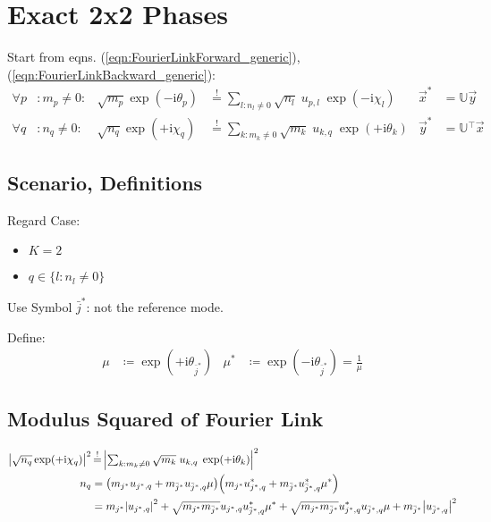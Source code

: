 \documentclass[
	english,
	a4paper,
	fontsize=10pt,
	parskip=half,
	titlepage=true,
	DIV=12,
	final
]{scrreprt}
\newcommand*{\transp}{\ensuremath{^\intercal}}
\newcommand*{\iunit}{\ensuremath{\mathrm{i}}}
\newcommand*{\equalCond}{  \mathop{=}\limits^!  }
\begin{document}
\chapter{Exact 2x2 Phases}
Start from eqns. (\ref{eqn:FourierLinkForward_generic}), (\ref{eqn:FourierLinkBackward_generic}):
\begin{align*}
	\forall p &: m_p \neq 0 :
&
	\sqrt{m_p} \exp(-\iunit \theta_p)
&\equalCond
	\sum_{l : n_l \neq 0} \sqrt{n_l} \; u_{p,l} \; \exp(-\iunit\chi_l)
&
	\vec{x}^{*} &= \mathbb{U} \vec{y}
\\
	\forall q &: n_q \neq 0 :
&
	\sqrt{n_q} \exp(+\iunit \chi_q)
&\equalCond
	\sum_{k : m_k \neq 0}
	\sqrt{m_k} \; u_{k,q} \; \exp(+\iunit\theta_k)
&
	\vec{y}^{*} &= \mathbb{U}\transp \vec{x}
\end{align*}

\section{Scenario, Definitions}
Regard Case:
\begin{itemize}
\item $K = 2$
\item $q \in \{l : n_l \neq 0\}$
\end{itemize}

Use Symbol $\bar{j}^*$: not the reference mode.

Define:
\begin{align}
	\mu
&\coloneqq
	\exp(+\iunit \theta_{\bar{j}^*})
&
	\mu^*
&\coloneqq
	\exp(-\iunit \theta_{\bar{j}^*})
=
	\frac{1}{\mu}
\end{align}

\section{Modulus Squared of Fourier Link}
\begin{align}
	\abs{
		\sqrt{n_q} \exp(+\iunit \chi_q)
	}^2
&\equalCond
	\abs{
		\textstyle \sum_{k : m_k \neq 0}
			\sqrt{m_k} \; u_{k,q} \; \exp(+\iunit\theta_k)
	}^2
\\
	n_q
&=
	\qty(
		m_{     j ^*} u_{     j ^*, q} +
		m_{\bar{j}^*} u_{\bar{j}^*, q} \mu
	)	
	\qty(
		m_{     j ^*} u_{     j ^*, q}^* +
		m_{\bar{j}^*} u_{\bar{j}^*, q}^* \mu^*
	) \\
&=
	  m_{j^*} \abs{u_{j^*, q}}^2
	+ \sqrt{m_{j^*} m_{\bar{j}^*}} u_{j^*, q}   u_{\bar{j}^*, q}^* \mu^*
	+ \sqrt{m_{j^*} m_{\bar{j}^*}} u_{j^*, q}^* u_{\bar{j}^*, q}   \mu
	+ m_{\bar{j}^*} \abs{u_{\bar{j}^*, q}}^2
\end{align}
\end{document}
